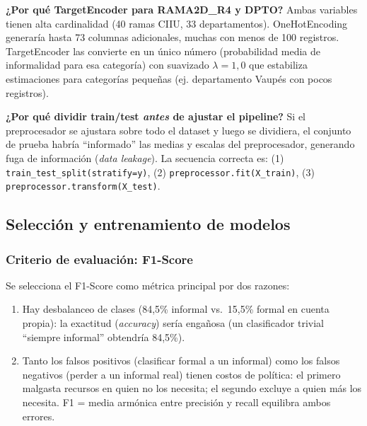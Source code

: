 \documentclass[12pt, a4paper]{article}
\begin{document}
\begin{decision}
\textbf{¿Por qué TargetEncoder para RAMA2D\_R4 y DPTO?} Ambas variables tienen alta
cardinalidad (40 ramas CIIU, 33 departamentos). OneHotEncoding generaría hasta 73
columnas adicionales, muchas con menos de 100 registros. TargetEncoder las convierte
en un único número (probabilidad media de informalidad para esa categoría) con suavizado
$\lambda = 1{,}0$ que estabiliza estimaciones para categorías pequeñas (ej. departamento
Vaupés con pocos registros).
\end{decision}

\begin{decision}
\textbf{¿Por qué dividir train/test \textit{antes} de ajustar el pipeline?} Si el
preprocesador se ajustara sobre todo el dataset y luego se dividiera, el conjunto de
prueba habría ``informado'' las medias y escalas del preprocesador, generando fuga de
información (\textit{data leakage}). La secuencia correcta es:
(1) \texttt{train\_test\_split(stratify=y)}, (2) \texttt{preprocessor.fit(X\_train)},
(3) \texttt{preprocessor.transform(X\_test)}.
\end{decision}

\subsection{Selección y entrenamiento de modelos}

\subsubsection{Criterio de evaluación: F1-Score}

Se selecciona el F1-Score como métrica principal por dos razones:

\begin{enumerate}[label=\arabic*.]
  \item Hay desbalanceo de clases (84{,}5\% informal vs.\ 15{,}5\% formal en cuenta
  propia): la exactitud (\textit{accuracy}) sería engañosa (un clasificador trivial
  ``siempre informal'' obtendría 84{,}5\%).
  \item Tanto los falsos positivos (clasificar formal a un informal) como los falsos
  negativos (perder a un informal real) tienen costos de política: el primero malgasta
  recursos en quien no los necesita; el segundo excluye a quien más los necesita.
  F1 = media armónica entre precisión y recall equilibra ambos errores.
\end{enumerate}
\end{document}
